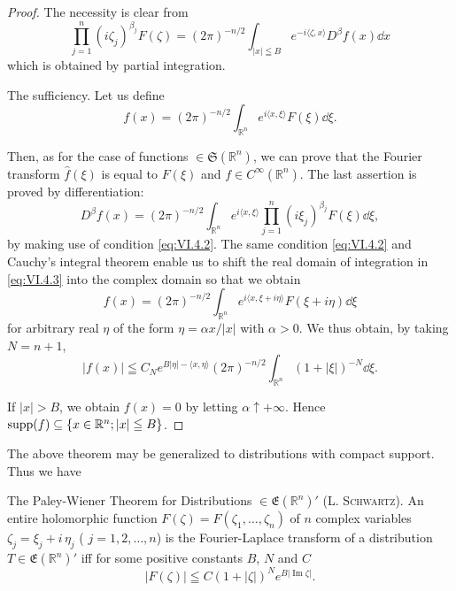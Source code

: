 \begin{proof}
 The necessity is clear from 
\[
\prod\limits_{j=1} ^{n} (i \zeta_{j}) ^ {\beta_{j}} F (\zeta) = (2 \pi) ^{-n/2} \int_{| x | \leqq B} e ^{- i \langle \zeta , x \rangle} D ^{\beta} f (x) \dd x
\]
which is obtained by partial integration. 

The sufficiency. Let us define 
\begin{equation}\label{eq:VI.4.3}
f (x) = (2 \pi) ^{-n/2} \int_ {\mathbb{R}^{n}} e ^{i \langle x, \xi \rangle} F (\xi) \dd \xi .
\end{equation}

Then, as for the case of functions $\in \mathfrak{S}(\mathbb{R}^{n})$, we can prove that the Fourier transform $\hat{f}(\xi)$ is equal to $F(\xi)$ and $f \in C^{\infty}(\mathbb{R}^{n})$. The last assertion is proved by differentiation: 
\begin{equation}\label{eq:VI.4.4}
D ^{\beta} f (x) = (2 \pi) ^{-n/2} \int_ {\mathbb{R}^{n}} e ^{i \langle x, \xi \rangle} \prod\limits_{j=1} ^{n} (i \xi_{j}) ^ {\beta_{j}} F (\xi) \dd \xi ,
\end{equation}
by making use of condition \eqref{eq:VI.4.2}. The same condition \eqref{eq:VI.4.2} and Cauchy's integral theorem enable us to shift the real domain of integration in \eqref{eq:VI.4.3} into the complex domain so that we obtain 
\begin{equation}\tag{3'}\label{eq:VI.4.3'}
f (x) = (2 \pi) ^{-n/2} \int_ {\mathbb{R}^{n}} e ^{i \langle x, \xi + i \eta \rangle} F (\xi + i \eta) \dd \xi
\end{equation}
for arbitrary real $\eta$ of the form $\eta = \alpha x / |x|$ with $\alpha > 0$. We thus obtain, by taking $N = n + 1$, 
\[
\left| f (x) \right| \leqq C _{N} e ^{B | \eta | - \langle x, \eta \rangle} (2 \pi) ^{-n/2} \int_ {\mathbb{R}^{n}} (1 + | \xi |) ^{-N} \dd \xi .
\]

If $|x| > B$, we obtain $f(x) = 0$ by letting $\alpha \uparrow + \infty$. Hence $\operatorname{supp}(f) \subseteq \{x \in \mathbb{R}^{n}; |x| \leqq B\}$. 
\end{proof}

The above theorem may be generalized to distributions with compact support. Thus we have 

The Paley-Wiener Theorem for Distributions $\in \mathfrak{E}(\mathbb{R}^{n})'$ (L. \textsc{Schwartz}). An entire holomorphic function $F(\zeta) = F(\zeta_1, \ldots, \zeta_n)$ of $n$ complex variables $\zeta_j = \xi_j + i\,\eta_j$ ( $j = 1, 2, \ldots, n$) is the Fourier-Laplace transform of a distribution $T \in \mathfrak{E}(\mathbb{R}^{n})'$ iff for some positive constants $B$, $N$ and $C$ 
\begin{equation}\label{eq:VI.4.5}
\left| F (\zeta) \right| \leqq C (1 + | \zeta |) ^{N} e ^{B | \operatorname{Im} \zeta |}.
\end{equation}

